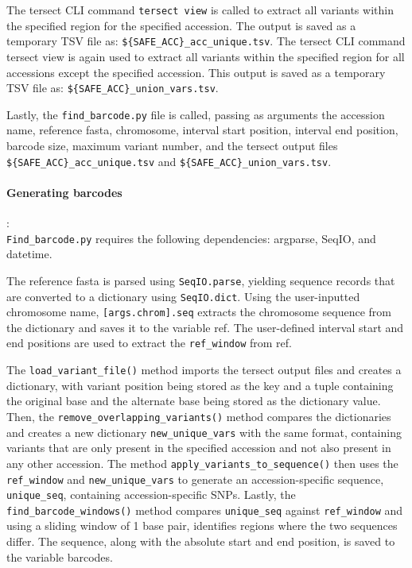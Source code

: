 \documentclass[12pt]{article}
\begin{document}
The tersect CLI command \verb+tersect view+  is called to extract all variants within the specified region for the specified accession. The output is saved as a temporary TSV file as: \verb+${SAFE_ACC}_acc_unique.tsv+. The tersect CLI command tersect view is again used to extract all variants within the specified region for all accessions except the specified accession. This output is saved as a temporary TSV file as: \verb+${SAFE_ACC}_union_vars.tsv+.  

Lastly, the \verb+find_barcode.py+ file is called, passing as arguments the accession name, reference fasta, chromosome, interval start position, interval end position, barcode size, maximum variant number, and the tersect output files  \verb+${SAFE_ACC}_acc_unique.tsv+ and  \verb+${SAFE_ACC}_union_vars.tsv+. 

\paragraph{Generating barcodes}: \\
\verb+Find_barcode.py+ requires the following dependencies: argparse, SeqIO, and datetime.  

The reference fasta is parsed using \verb+SeqIO.parse+, yielding sequence records that are converted to a dictionary using \verb+SeqIO.dict+. Using the user-inputted chromosome name, \verb+[args.chrom].seq+ extracts the chromosome sequence from the dictionary and saves it to the variable ref. The user-defined interval start and end positions are used to extract the \verb+ref_window+ from ref. 

The \verb+load_variant_file()+ method imports the tersect output files and creates a dictionary, with variant position being stored as the key and a tuple containing the original base and the alternate base being stored as the dictionary value. Then, the \verb+remove_overlapping_variants()+ method compares the dictionaries and creates a new dictionary \verb+new_unique_vars+ with the same format, containing variants that are only present in the specified accession and not also present in any other accession. The method \verb+apply_variants_to_sequence()+ then uses the \verb+ref_window+ and \verb+new_unique_vars+ to generate an accession-specific sequence, \verb+unique_seq+, containing accession-specific SNPs. Lastly, the \verb+find_barcode_windows()+ method compares \verb+unique_seq+ against \verb+ref_window+ and using a sliding window of 1 base pair, identifies regions where the two sequences differ. The sequence, along with the absolute start and end position, is saved to the variable barcodes.  
\end{document}
